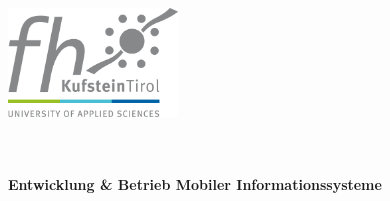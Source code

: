 \begin{titlepage}

    \vfill
    \begin{center}
      \includegraphics[width=4.5cm]{img/kufstein_logo.png} \\
    \end{center}
    \vfill

    \begin{center}
      \Large \textbf{\mytitle}
    \end{center}
    \vfill



    \begin{center}
      \textbf{\myname}\\
      \vspace{0.1cm}
      \textbf{\mypkz}\\
      \vspace{0.1cm}
      \textbf{Entwicklung \& Betrieb Mobiler Informationssysteme}\\
      \vspace{0.1cm}
      \textbf{\studyprogram}\\
      \vspace{0.1cm}
      \textbf{\mydate}
    \end{center}
    \vfill
  \end{titlepage}
